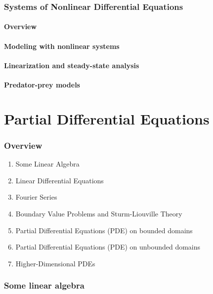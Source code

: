 \documentclass{article}
\begin{document}
\pagebreak

\section{Systems of Nonlinear Differential Equations}

\subsection*{Overview}

\subsection{Modeling with nonlinear systems}
\subsection{Linearization and steady-state analysis}
\subsection{Predator-prey models}

\part{Partial Differential Equations} %
\label{prt:Partial Differential Equations}

\section{Overview}%
\label{sec:Overview}

\begin{enumerate}
    \item Some Linear Algebra
    \item Linear Differential Equations
    \item Fourier Series
    \item Boundary Value Problems and Sturm-Liouville Theory
    \item Partial Differential Equations (PDE) on bounded domains
    \item Partial Differential Equations (PDE) on unbounded domains
    \item Higher-Dimensional PDEs
\end{enumerate}

\pagebreak

\section{Some linear algebra}
\end{document}
